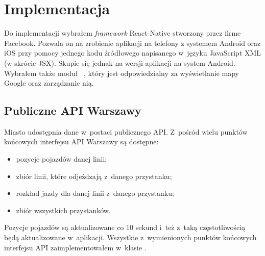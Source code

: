\documentclass{SGGW-thesis}
\begin{document}
\chapter{Implementacja}
Do implementacji wybrałem \textit{framework} React-Native stworzony przez firme Facebook\cite{REACT}.
Pozwala on na zrobienie aplikacji na telefony z systemem Android oraz iOS przy pomocy jednego kodu źródłowego napisanego w~języku JavaScript XML (w skrócie JSX).
Skupie się jednak na wersji aplikacji na system Android.
Wybrałem także moduł ~\cite{REACTMAPS}, który jest odpowiedzialny za wyświetlanie mapy Google oraz zarządzanie nią.

\section{Publiczne API Warszawy}
Miasto udostępnia dane w~postaci publicznego API.
Z~pośród wielu punktów końcowych interfejsu API Warszawy są dostępne:
\begin{itemize}
  \item{pozycje pojazdów danej linii;}
  \item{zbiór linii, które odjeżdzają z~danego przystanku;}
  \item{rozkład jazdy dla danej linii z~danego przystanku;}
  \item{zbiór wszystkich przystanków.}
\end{itemize}
Pozycje pojazdów są aktualizowane co 10 sekund i~też z~taką częstotliwością będą aktualizowane w~aplikacji.
Wszystkie z~wymienionych punktów końcowych interfejsu API zaimplementowałem w~klasie .
\end{document}
